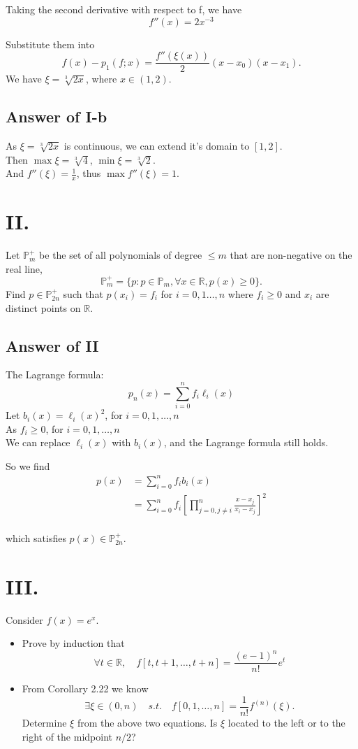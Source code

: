 \documentclass[a4paper]{article}
\begin{document}
Taking the second derivative with respect to f, we have $$f''(x)=2x^{-3}$$

Substitute them into
$$
f(x) - p_1(f;x) = \frac{f''(\xi(x))}{2} (x - x_0)(x-x_1).
$$
We have $\xi=\sqrt[3]{2x}$, where $x \in (1,2)$.

\subsection*{Answer of I-b}
As $\xi=\sqrt[3]{2x}$ is continuous, we can extend it's domain to $[1,2]$.\\
Then $\max\xi=\sqrt[3]{4}$, $\min\xi=\sqrt[3]{2}$.\\
And $f''(\xi)=\frac{1}{x}$, thus $\max f''(\xi)=1$.

\section*{II.}
Let $\mathbb{P}_m^+$ be the set of all polynomials of degree $\leq m$
that are non-negative on the real line,
$$
\mathbb{P}_m^+ = \{p : p \in \mathbb{P}_m, \forall x \in \mathbb{R}, p(x) \geq 0\}.
$$
Find $p \in \mathbb{P}_{2n}^+$ such that $p(x_i) = f_i$ for $i = 0,1\ldots,n$
where $f_i \geq 0$ and $x_i$ are distinct points on $\mathbb{R}$.
\subsection*{Answer of II}

The Lagrange formula:
$$p_n(x)=\sum_{i=0}^n f_i \ell_i(x)$$
Let $b_i(x)=\ell_i(x)^2$, for $i= 0,1,\ldots,n$\\
As $f_i \geq 0$, for $i= 0,1,\ldots,n$\\
We can replace $\ell_i(x)$ with $b_i(x)$, 
and the Lagrange formula still holds.

So we find
\begin{align*}
  p(x)&=\sum_{i=0}^n f_i b_i(x)\\
  &=\sum_{i=0}^n f_i [\prod_{j=0,j\neq i}^{n} \frac{x-x_j}{x_i-x_j}]^2
\end{align*}
\\
which satisfies $p(x) \in \mathbb{P}_{2n}^+$.

\section*{III.}
Consider $f(x) = e^x$.
\begin{itemize}
  \item Prove by induction that
  $$\forall t \in \mathbb{R},\quad f[t,t+1,\ldots,t+n]=\frac{(e-1)^n}{n!}e^t$$
  \item From Corollary 2.22 we know
  $$ \exists \xi \in (0,n) \quad s.t. \quad f[0,1,\ldots,n]=\frac{1}{n!}f^{(n)}(\xi).$$
  Determine $\xi$ from the above two equations. Is $\xi$
  located to the left or to the right of the midpoint $n/2$?
\end{itemize}
\end{document}
